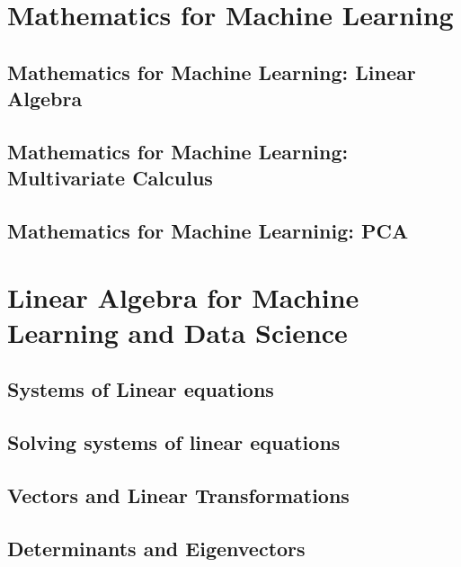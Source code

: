 \documentclass[a4paper, 11pt]{book}
\begin{document}
    \part{Mathematics for Machine Learning}
    \chapter{Mathematics for Machine Learning: Linear Algebra}
    \chapter{Mathematics for Machine Learning: Multivariate Calculus}
    \chapter{Mathematics for Machine Learninig: PCA}
    
    \part{Linear Algebra for Machine Learning and Data Science}
    \chapter{Systems of Linear equations}
    \chapter{Solving systems of linear equations}
    \chapter{Vectors and Linear Transformations}
    \chapter{Determinants and Eigenvectors}
\end{document}

